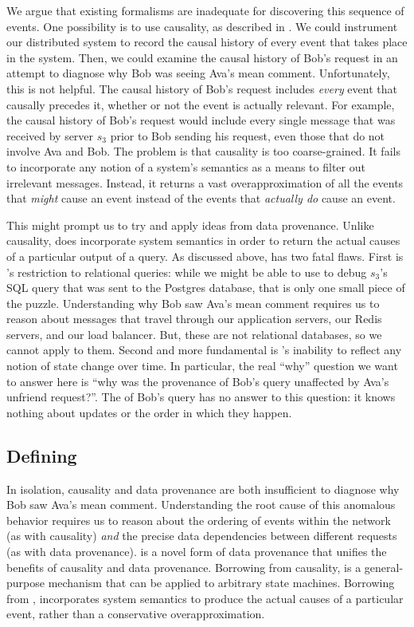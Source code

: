 We argue that existing formalisms are inadequate for discovering this
sequence of events. One possibility is to use causality, as described in
. We could instrument our distributed system to record the
causal history of every event that takes place in the system. Then, we could
examine the causal history of Bob's request in an attempt to diagnose why Bob
was seeing Ava's mean comment. Unfortunately, this is not helpful. The causal
history of Bob's request includes \emph{every} event that causally precedes it,
whether or not the event is actually relevant. For example, the causal history
of Bob's request would include every single message that was received by server
$s_3$ prior to Bob sending his request, even those that do not involve Ava and
Bob. The problem is that causality is too coarse-grained. It fails to
incorporate any notion of a system's semantics as a means to filter out
irrelevant messages. Instead, it returns a vast overapproximation of all the
events that \emph{might} cause an event instead of the events that
\emph{actually do} cause an event.

This might prompt us to try and apply ideas from data provenance. Unlike
causality, \whyprovenance{} does incorporate system semantics in order to
return the actual causes of a particular output of a query. As discussed
above, \whyprovenance{} has two fatal flaws. First is \whyprovenance{}'s
restriction to relational queries: while we might be able to use
\whyprovenance{} to debug $s_3$'s SQL query that was sent to the Postgres
database, that is only one small piece of the puzzle. Understanding why Bob
saw Ava's mean comment requires us to reason about messages that travel through
our application servers, our Redis servers, and our load balancer. But, these
are not relational databases, so we cannot apply \whyprovenance{} to them.
Second and more fundamental is \whyprovenance{}'s inability to reflect any
notion of state change over time. In particular, the real ``why'' question we
want to answer here is ``why was the provenance of Bob's query unaffected by
Ava's unfriend request?''. The \whyprovenance{} of Bob's query has no answer to
this question: it knows nothing about updates or the order in which they
happen.

\subsection{Defining \WatProvenance{}}
In isolation, causality and data provenance are both insufficient to diagnose
why Bob saw Ava's mean comment. Understanding the root cause of this anomalous
behavior requires us to reason about the ordering of events within the network
(as with causality) \emph{and} the precise data dependencies between different
requests (as with data provenance).
%
 is a novel form of data provenance that unifies the
benefits of causality and data provenance. Borrowing from causality,
\watprovenance{} is a general-purpose mechanism that can be applied to
arbitrary state machines. Borrowing from \whyprovenance{}, \watprovenance{}
incorporates system semantics to produce the actual causes of a particular
event, rather than a conservative overapproximation.

